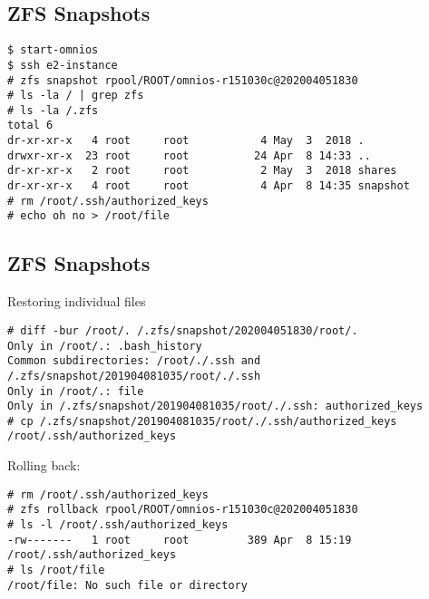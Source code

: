 \documentclass[xga]{xdvislides}
\begin{document}
\subsection{ZFS Snapshots}
\smallish
\begin{verbatim}
$ start-omnios
$ ssh e2-instance
# zfs snapshot rpool/ROOT/omnios-r151030c@202004051830
# ls -la / | grep zfs
# ls -la /.zfs
total 6
dr-xr-xr-x   4 root     root           4 May  3  2018 .
drwxr-xr-x  23 root     root          24 Apr  8 14:33 ..
dr-xr-xr-x   2 root     root           2 May  3  2018 shares
dr-xr-xr-x   4 root     root           4 Apr  8 14:35 snapshot
# rm /root/.ssh/authorized_keys
# echo oh no > /root/file
\end{verbatim}
\Normalsize

\subsection{ZFS Snapshots}
Restoring individual files
\smallish
\begin{verbatim}
# diff -bur /root/. /.zfs/snapshot/202004051830/root/.
Only in /root/.: .bash_history
Common subdirectories: /root/./.ssh and /.zfs/snapshot/201904081035/root/./.ssh
Only in /root/.: file
Only in /.zfs/snapshot/201904081035/root/./.ssh: authorized_keys
# cp /.zfs/snapshot/201904081035/root/./.ssh/authorized_keys /root/.ssh/authorized_keys
\end{verbatim}

\vspace{.5in}
Rolling back:
\begin{verbatim}
# rm /root/.ssh/authorized_keys
# zfs rollback rpool/ROOT/omnios-r151030c@202004051830
# ls -l /root/.ssh/authorized_keys
-rw-------   1 root     root         389 Apr  8 15:19 /root/.ssh/authorized_keys
# ls /root/file
/root/file: No such file or directory
\end{verbatim}
\Normalsize
\end{document}
